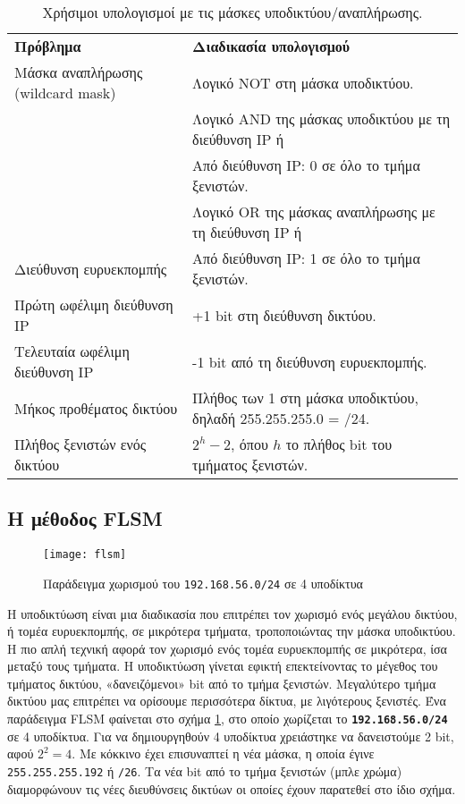 \documentclass{EdipyLabs} %
\begin{document}
\begin{table}\centering\renewcommand{\arraystretch}{1.5}
\begin{tabular}{ll}
	\FormatFirstRow
	\textbf{Πρόβλημα} & \textbf{Διαδικασία υπολογισμού}\\
	Μάσκα αναπλήρωσης (wildcard mask)			& Λογικό NOT στη μάσκα υποδικτύου.\\
	
	\rowcolor{lightgray}						& Λογικό AND της μάσκας υποδικτύου με τη διεύθυνση IP ή\\
	\rowcolor{lightgray}
	\multirow{-2}{*}{Διεύθυνση δικτύου} 		& Από διεύθυνση IP: 0 σε όλο το τμήμα ξενιστών. \\ 
												& Λογικό OR της μάσκας αναπλήρωσης με τη διεύθυνση IP ή\\
	\multirow{-2}{*}{Διεύθυνση ευρυεκπομπής}	& Από διεύθυνση IP: 1 σε όλο το τμήμα ξενιστών.\\
	\rowcolor{lightgray}
	Πρώτη ωφέλιμη διεύθυνση IP 					& +1 bit στη διεύθυνση δικτύου.\\
	Τελευταία ωφέλιμη διεύθυνση IP 				& -1 bit από τη διεύθυνση ευρυεκπομπής.\\
	\rowcolor{lightgray}
	Μήκος προθέματος δικτύου					& Πλήθος των 1 στη μάσκα υποδικτύου, δηλαδή 255.255.255.0 = /24.\\
	Πλήθος ξενιστών ενός δικτύου 				& $2^{h}-2$, όπου $h$ το πλήθος bit του τμήματος ξενιστών.\\
\end{tabular}\caption{Χρήσιμοι υπολογισμοί με τις μάσκες υποδικτύου/αναπλήρωσης.}\label{tab:trics}
\end{table}

\subsection{Η μέθοδος FLSM}

\begin{figure}
	\centering
	\texttt{[image: flsm]}
	\caption{Παράδειγμα χωρισμού του \texttt{192.168.56.0/24} σε 4 υποδίκτυα}\label{fig:flsm}
\end{figure}

Η υποδικτύωση είναι μια διαδικασία που επιτρέπει τον χωρισμό ενός μεγάλου δικτύου, ή τομέα ευρυεκπομπής, σε μικρότερα τμήματα, τροποποιώντας την μάσκα υποδικτύου. Η πιο απλή τεχνική αφορά τον χωρισμό ενός τομέα ευρυεκπομπής σε μικρότερα, ίσα μεταξύ τους τμήματα. Η υποδικτύωση γίνεται εφικτή επεκτείνοντας το μέγεθος του τμήματος δικτύου, «δανειζόμενοι» bit από το τμήμα ξενιστών. Μεγαλύτερο τμήμα δικτύου μας επιτρέπει να ορίσουμε περισσότερα δίκτυα, με λιγότερους ξενιστές. Ένα παράδειγμα FLSM φαίνεται στο σχήμα \ref{fig:flsm}, στο οποίο χωρίζεται το \textbf{\texttt{192.168.56.0/24}} σε 4 υποδίκτυα. Για να δημιουργηθούν 4 υποδίκτυα χρειάστηκε να δανειστούμε 2 bit, αφού $2^2=4$. Με κόκκινο έχει επισυναπτεί η νέα μάσκα, η οποία έγινε \texttt{255.255.255.192} ή \texttt{/26}. Τα νέα bit από το τμήμα ξενιστών (μπλε χρώμα) διαμορφώνουν τις νέες διευθύνσεις δικτύων οι οποίες έχουν παρατεθεί στο ίδιο σχήμα.
\end{document}
